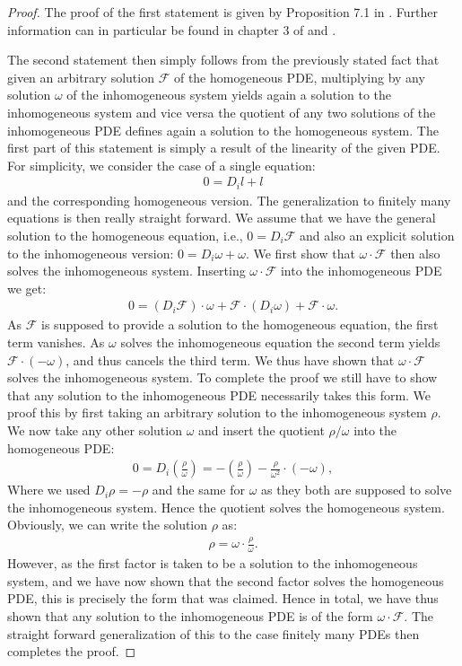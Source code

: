 \begin{proof}
The proof of the first statement is given by Proposition 7.1 in \cite{seiler1994analysis}. Further information can in particular be found in chapter 3 of \cite{seiler2009involution} and \cite{articleCH}. 

The second statement then simply follows from the previously stated fact that given an arbitrary solution $\mathcal{F}$ of the homogeneous PDE, multiplying by any solution $\omega$ of the inhomogeneous system yields again a solution to the inhomogeneous system and vice versa the quotient of any two solutions of the inhomogeneous PDE defines again a solution to the homogeneous system. The first part of this statement is simply a result of the linearity of the given PDE. For simplicity, we consider the case of a single equation: 
\begin{align}
    0=D_i l + l 
\end{align}
and the corresponding homogeneous version. The generalization to finitely many equations is then really straight forward. 
We assume that we have the general solution to the homogeneous equation, i.e., $0 = D_i \mathcal{F}$ and also an explicit solution to the inhomogeneous version: $0 = D_i \omega + \omega$.
We first show that $\omega \cdot \mathcal{F}$ then also solves the inhomogeneous system. Inserting $\omega \cdot \mathcal{F}$ into the inhomogeneous PDE we get: 
\begin{align}
    0 = \left ( D_i \mathcal{F} \right ) \cdot \omega + \mathcal{F} \cdot \left ( D_i \omega \right) + \mathcal{F} \cdot \omega. 
\end{align}
As $\mathcal{F}$ is supposed to provide a solution to the homogeneous equation, the first term vanishes. As $\omega$ solves the inhomogeneous equation the second term yields $\mathcal{F} \cdot \left ( - \omega \right )$,
and thus cancels the third term. We thus have shown that $\omega \cdot \mathcal{F}$ solves the inhomogeneous system. To complete the proof we still have to show that any solution to the inhomogeneous PDE necessarily takes this form. We proof this by first taking an arbitrary solution to the inhomogeneous system $\rho$. We now take any other solution $\omega$ and insert the quotient $\rho/\omega$ into the homogeneous PDE:
\begin{align}
    0 = D_i \left (\frac{\rho}{\omega} \right) = - (\frac{\rho}{\omega}) - \frac{\rho}{\omega^2} \cdot (-\omega) ,
\end{align}
Where we used $D_i \rho = -\rho$ and the same for $\omega$ as they both are supposed to solve the inhomogeneous system. Hence the quotient solves the homogeneous system. Obviously, we can write the solution $\rho$ as: 
\begin{align}
    \rho = \omega \cdot  \frac{\rho}{\omega}.
\end{align}
However, as the first factor is taken to be a solution to the inhomogeneous system, and we have now shown that the second factor solves the homogeneous PDE, this is precisely the form that was claimed. 
Hence in total, we have thus shown that any solution to the inhomogeneous PDE is of the form $\omega \cdot \mathcal{F}$.
The straight forward generalization of this to the case finitely many PDEs then completes the proof.
\end{proof}
